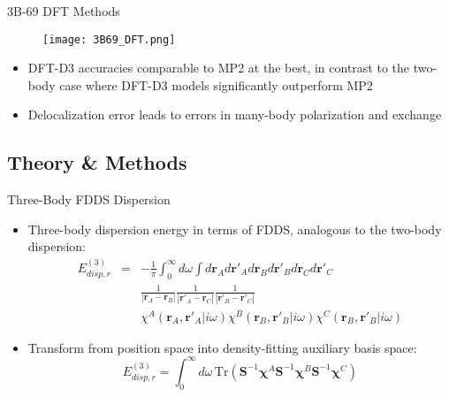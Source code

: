 \documentclass{beamer}
\begin{document}
        \begin{frame}{3B-69 DFT Methods}
            \begin{figure}
                \centering
                \texttt{[image: 3B69\_DFT.png]}
            \end{figure}
            \begin{itemize}
                \item DFT-D3 accuracies comparable to MP2 at the best, in contrast to the two-body case where DFT-D3 models significantly outperform MP2
                \item Delocalization error leads to errors in many-body polarization and exchange
            \end{itemize}
        \end{frame}

    \subsection{Theory \& Methods}

        \begin{frame}{Three-Body FDDS Dispersion}
            \begin{itemize}
                \item Three-body dispersion energy in terms of FDDS, analogous to the two-body dispersion:
                \begin{eqnarray}
                    \nonumber
                    E_{disp,r}^{(3)} &=& -\frac{1}{\pi}\int_0^\infty d\omega \int d\mathbf{r}_A d\mathbf{r}'_A d\mathbf{r}_B d\mathbf{r}'_B d\mathbf{r}_C d\mathbf{r}'_C \\ \nonumber
                    & & \frac{1}{|\mathbf{r}_A-\mathbf{r}_B|} \frac{1}{|\mathbf{r}'_A-\mathbf{r}_C|} \frac{1}{|\mathbf{r}'_B-\mathbf{r}'_C|} \\ \nonumber
                    & & \chi^A\left(\mathbf{r}_A,\mathbf{r}'_A|i\omega\right)\chi^B\left(\mathbf{r}_B,\mathbf{r}'_B|i\omega\right)\chi^C\left(\mathbf{r}_B,\mathbf{r}'_B|i\omega\right)
                \end{eqnarray}
                \item Transform from position space into density-fitting auxiliary basis space:
                $$E_{disp,r}^{(3)} = \int_0^\infty d\omega\,\mathrm{Tr}\left(\mathbf{S}^{-1}\boldsymbol{\chi}^A\mathbf{S}^{-1}\boldsymbol{\chi}^B\mathbf{S}^{-1}\boldsymbol{\chi}^C\right)$$
            \end{itemize}
        \end{frame}
\end{document}
